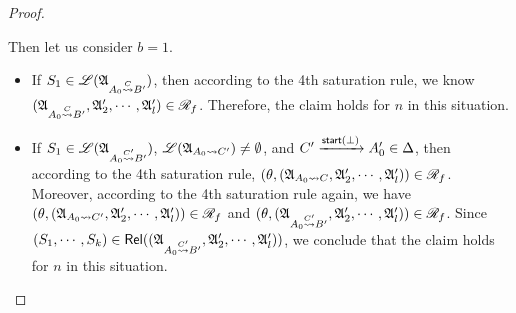 \begin{proof}
{\begin{itemize}
  Then let us consider $b = 1$. 
  \begin{itemize}
  \item If $S_1 \in {\mathscr{L} }({\mathfrak{A} }_{A_0\stackrel{C}{\rightsquigarrow} B'})$, then according to the 4th saturation rule, we know $({\mathfrak{A} }_{A_0\stackrel{C}{\rightsquigarrow} B'}, {\mathfrak{A} }'_2, \cdots, {\mathfrak{A} }'_l) \in \mathscr{R}_f$. Therefore, the claim holds for $n$ in this situation.   
   \item If $S_1 \in {\mathscr{L} }({\mathfrak{A} }_{A_0\stackrel{C'}{\rightsquigarrow} B'})$, ${\mathscr{L} }({\mathfrak{A} }_{A_0\rightsquigarrow C'}) \neq \emptyset$, and $C' \xrightarrow[]{{\mathsf{start} }(\bot)} A'_0 \in \Delta$, then 
   according to the 4th saturation rule, $(\theta, ({\mathfrak{A} }_{A_0\rightsquigarrow C}, {\mathfrak{A} }'_2, \cdots, {\mathfrak{A} }'_l)) \in \mathscr{R}_f$. Moreover, according to the 4th saturation rule again, we have $(\theta, ({\mathfrak{A} }_{A_0\rightsquigarrow C'}, {\mathfrak{A} }'_2, \cdots, {\mathfrak{A} }'_l)) \in \mathscr{R}_f$ and $(\theta, ({\mathfrak{A} }_{A_0\stackrel{C'}{\rightsquigarrow} B'}, {\mathfrak{A} }'_2, \cdots, {\mathfrak{A} }'_l)) \in \mathscr{R}_f$. 
   Since $(S_1, \cdots, S_k) \in \mathsf{Rel}(({\mathfrak{A} }_{A_0\stackrel{C'}{\rightsquigarrow} B'}, {\mathfrak{A} }'_2, \cdots, {\mathfrak{A} }'_l))$,  we conclude that the claim holds for $n$ in this situation. 
   \end{itemize}
    \end{itemize}
   
    
}
\end{proof}
